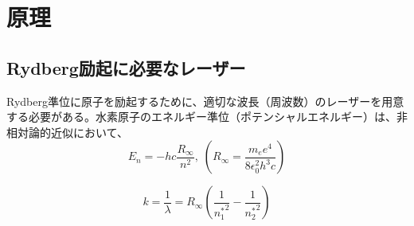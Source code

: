 \documentclass[dvipdfmx]{jsreport}
\begin{document}
\clearpage
\chapter{原理}
\section{Rydberg励起に必要なレーザー}
\label{sec:rydberg}
Rydberg準位に原子を励起するために、適切な波長（周波数）のレーザーを用意する必要がある。水素原子のエネルギー準位（ポテンシャルエネルギー）は、非相対論的近似において、
\begin{equation}
\label{rydberg}
 E_n = -hc\frac{R_{\infty}}{n^2},\; \left(R_{\infty} = \frac{m_e e^4}{8 \epsilon_0^2 h^3 c} \right)
\end{equation}

\begin{equation}
 k = \frac{1}{\lambda} = R_{\infty}\left( \frac{1}{{n_1^*}^2} - \frac{1}{{n_2^*}^2} \right)
\end{equation}
\end{document}
